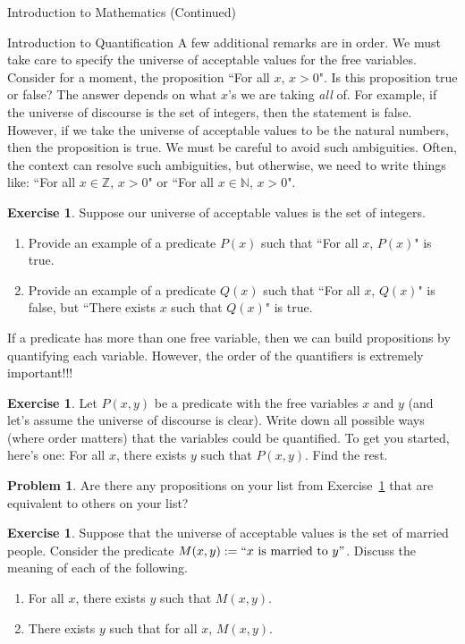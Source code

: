 \documentclass[11pt]{article}
\theoremstyle{definition}
\newtheorem{exercise}[theorem]{Exercise}
\newtheorem{problem}[theorem]{Problem}
\begin{document}
\begin{section}{Introduction to Mathematics (Continued)}
\begin{subsection}{Introduction to Quantification}
A few additional remarks are in order.  We must take care to specify the universe of acceptable values for the free variables.  Consider for a moment, the proposition ``For all $x$, $x>0$".  Is this proposition true or false?  The answer depends on what $x$'s we are taking \emph{all} of.  For example, if the universe of discourse is the set of integers, then the statement is false.  However, if we take the universe of acceptable values to be the natural numbers, then the proposition is true.  We must be careful to avoid such ambiguities.  Often, the context can resolve such ambiguities, but otherwise, we need to write things like: ``For all $x\in\mathbb{Z}$, $x>0$" or ``For all $x\in\mathbb{N}$, $x>0$".

\begin{exercise}
Suppose our universe of acceptable values is the set of integers.
\begin{enumerate}
\item Provide an example of a predicate $P(x)$ such that ``For all $x$, $P(x)$" is true.
\item Provide an example of a predicate $Q(x)$ such that ``For all $x$, $Q(x)$" is false, but ``There exists $x$ such that $Q(x)$" is true.
\end{enumerate}
\end{exercise}

If a predicate has more than one free variable, then we can build propositions by quantifying each variable.  However, the order of the quantifiers is extremely important!!!

\begin{exercise}\label{exer:ways to quantify}
Let $P(x,y)$ be a predicate with the free variables $x$ and $y$ (and let's assume the universe of discourse is clear).  Write down all possible ways (where order matters) that the variables could be quantified.  To get you started, here's one: For all $x$, there exists $y$ such that $P(x,y)$.  Find the rest.
\end{exercise}

\begin{problem}
Are there any propositions on your list from Exercise~\ref{exer:ways to quantify} that are equivalent to others on your list?  
\end{problem}

\begin{exercise}
Suppose that the universe of acceptable values is the set of married people.  Consider the predicate $M(x,y):=``x\mbox{ is married to }y"$.  Discuss the meaning of each of the following.
\begin{enumerate}
\item For all $x$, there exists $y$ such that $M(x,y)$.
\item There exists $y$ such that for all $x$, $M(x,y)$.
\end{enumerate}
\end{exercise}


\end{subsection}
\end{section}
\end{document}
